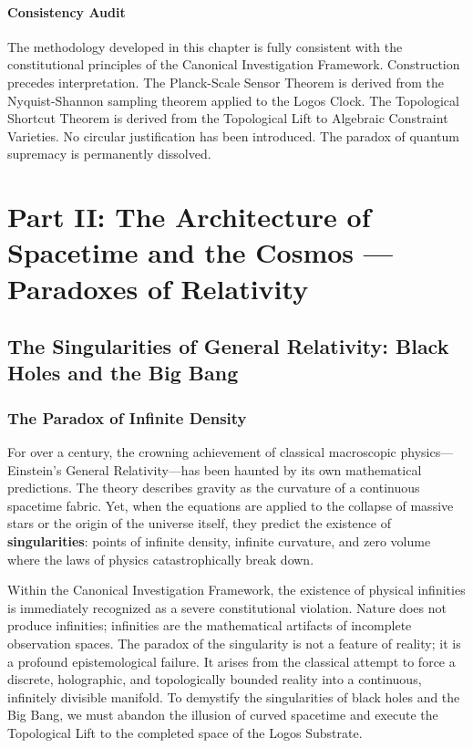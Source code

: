 \documentclass[12pt,twoside]{extbook}
\theoremstyle{definition}
\theoremstyle{remark}
\newcommand{\term}[1]{\textcolor{brandPrimary}{\textbf{#1}}}
\begin{document}
\subsection*{Consistency Audit}
The methodology developed in this chapter is fully consistent with the constitutional principles of the Canonical Investigation Framework. Construction precedes interpretation. The Planck-Scale Sensor Theorem is derived from the Nyquist-Shannon sampling theorem applied to the Logos Clock. The Topological Shortcut Theorem is derived from the Topological Lift to Algebraic Constraint Varieties. No circular justification has been introduced. The paradox of quantum supremacy is permanently dissolved.

\part*{Part II: The Architecture of Spacetime and the Cosmos --- Paradoxes of Relativity}

\chapter{The Singularities of General Relativity: Black Holes and the Big Bang}

\section{The Paradox of Infinite Density}
For over a century, the crowning achievement of classical macroscopic physics—Einstein's General Relativity—has been haunted by its own mathematical predictions. The theory describes gravity as the curvature of a continuous spacetime fabric. Yet, when the equations are applied to the collapse of massive stars or the origin of the universe itself, they predict the existence of \term{singularities}: points of infinite density, infinite curvature, and zero volume where the laws of physics catastrophically break down.

Within the Canonical Investigation Framework, the existence of physical infinities is immediately recognized as a severe constitutional violation. Nature does not produce infinities; infinities are the mathematical artifacts of incomplete observation spaces. The paradox of the singularity is not a feature of reality; it is a profound epistemological failure. It arises from the classical attempt to force a discrete, holographic, and topologically bounded reality into a continuous, infinitely divisible manifold. To demystify the singularities of black holes and the Big Bang, we must abandon the illusion of curved spacetime and execute the Topological Lift to the completed space of the Logos Substrate.
\end{document}
